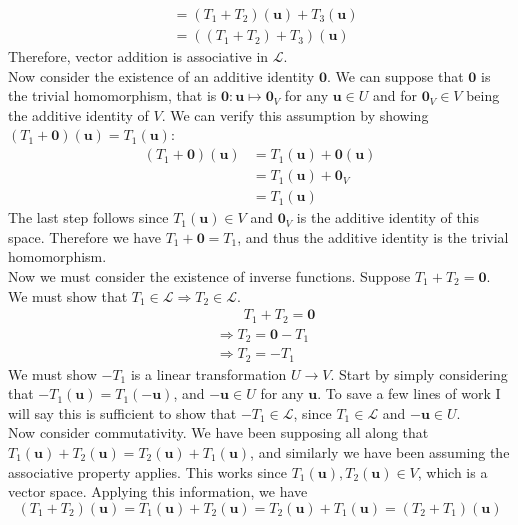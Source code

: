 \documentclass[12pt, letterpaper]{article}
\begin{document}
\begin{solution}
\begin{align*}
        &=(T_1 +T_2)(\mathbf{u})+T_3(\mathbf{u})\\
        &=((T_1 +T_2)+T_3)(\mathbf{u})
    \end{align*}
    Therefore, vector addition is associative in \(\mathcal{L}\).\\
    Now consider the existence of an additive identity \(\mathbf{0}\). We can suppose that \(\mathbf{0}\) is the trivial homomorphism, that is \(\mathbf{0}:\mathbf{u}\mapsto \mathbf{0}_V\) for any \(\mathbf{u}\in U\) and for \(\mathbf{0}_V \in V\) being the additive identity of \(V\). We can verify this assumption by showing \((T_1 +\mathbf{0})(\mathbf{u})=T_1(\mathbf{u})\):
    \begin{align*}
        (T_1 +\mathbf{0})(\mathbf{u})&=T_1(\mathbf{u})+\mathbf{0}(\mathbf{u})\\
        &=T_1(\mathbf{u})+\mathbf{0}_V\\
        &=T_1(\mathbf{u})
    \end{align*}
    The last step follows since \(T_1(\mathbf{u})\in V\) and \(\mathbf{0}_V\) is the additive identity of this space. Therefore we have \(T_1 +\mathbf{0}=T_1\), and thus the additive identity is the trivial homomorphism.\\
    Now we must consider the existence of inverse functions. Suppose \(T_1 +T_2 = \mathbf{0}\). We must show that \(T_1\in\mathcal{L} \Longrightarrow T_2\in \mathcal{L} \).
    \begin{align*}
        &\qquad T_1 +T_2 =\mathbf{0}\\
        &\Longrightarrow T_2 = \mathbf{0}-T_1\\
        &\Longrightarrow T_2 =-T_1
    \end{align*}
    We must show \(-T_1\) is a linear transformation \(U\to V\). Start by simply considering that \(-T_1(\mathbf{u})=T_1(-\mathbf{u})\), and \(-\mathbf{u}\in U\) for any \(\mathbf{u}\). To save a few lines of work I will say this is sufficient to show that \(-T_1\in\mathcal{L} \), since \(T_1\in\mathcal{L} \) and \(-\mathbf{u}\in U\).\\
    Now consider commutativity. We have been supposing all along that \(T_1(\mathbf{u})+T_2(\mathbf{u})=T_2(\mathbf{u})+T_1(\mathbf{u})\), and similarly we have been assuming the associative property applies. This works since \(T_1(\mathbf{u}),T_{2}(\mathbf{u})\in V \), which is a vector space. Applying this information, we have
    \[
        (T_1 +T_2)(\mathbf{u})=T_1(\mathbf{u})+T_2(\mathbf{u})=T_2(\mathbf{u})+T_1(\mathbf{u})=(T_2 +T_1)(\mathbf{u})
\]
\end{solution}
\end{document}
